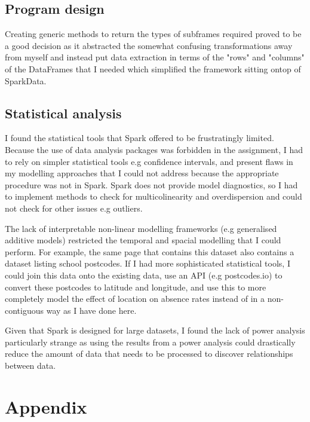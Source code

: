 \documentclass{article}
\begin{document}
    \subsection*{Program design}
    Creating generic methods to return the types of subframes required proved to be a good decision as it abstracted the somewhat confusing transformations away from myself and instead put data extraction in terms of the "rows" and "columns" of the DataFrames that I needed which simplified the framework sitting ontop of SparkData.

    \subsection*{Statistical analysis}
    I found the statistical tools that Spark offered to be frustratingly limited. Because the use of data analysis packages was forbidden in the assignment, I had to rely on simpler statistical tools e.g confidence intervals, and present flaws in my modelling approaches that I could not address because the appropriate procedure was not in Spark. Spark does not provide model diagnostics, so I had to implement methods to check for multicolinearity and overdispersion and could not check for other issues e.g outliers.

    The lack of interpretable non-linear modelling frameworks (e.g generalised additive models) restricted the temporal and spacial modelling that I could perform. For example, the same page that contains this dataset also contains a dataset listing school postcodes. If I had more sophisticated statistical tools, I could join this data onto the existing data, use an API (e.g postcodes.io) to convert these postcodes to latitude and longitude, and use this to more completely model the effect of location on absence rates instead of in a non-contiguous way as I have done here.

    Given that Spark is designed for large datasets, I found the lack of power analysis particularly strange as using the results from a power analysis could drastically reduce the amount of data that needs to be processed to discover relationships between data.

\newpage

\section*{Appendix}
\end{document}
